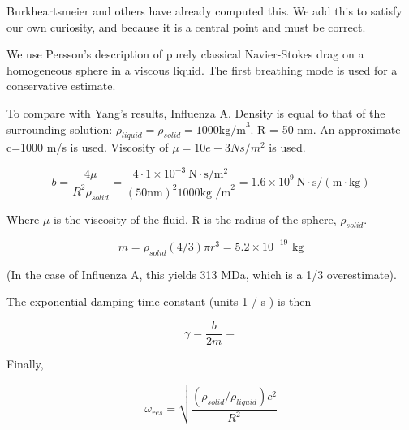 \documentclass[paper.tex]{subfiles}
\begin{document}
\begin{autem}
	Burkheartsmeier and others have already computed this. We add this to satisfy our own curiosity, and because it is a central point and must be correct.
\end{autem}


We use Persson's description of purely classical Navier-Stokes drag \cite{nature1986} on a homogeneous sphere in a viscous liquid. The first breathing mode is used for a conservative estimate.

To compare with Yang's results, Influenza A. Density is equal to that of the surrounding solution: $\rho_{liquid} = \rho_{solid} = 1000 \text{kg/m}^3$. R = 50 nm. An approximate c=1000 m/s is used. Viscosity of $\mu=10e-3 Ns/m^2$ is used.

$$ b = \frac{4\mu}{R^2 \rho_{solid}} = \frac{4 \cdot 1\times 10^{-3}\  \text{N}\cdot \text{s} / \text{m}^2 }{(50 \text{nm})^2 1000 \text{kg /m}^2} = 1.6 \times 10^9\ \text{N}\cdot \text{s} /( \text{m}\cdot\text{kg})$$

Where $\mu$ is the viscosity of the fluid, R is the radius of the sphere, $\rho_{solid}$. \footnotemark



$$m = \rho_{solid}  (4/3) \pi r^3 = 5.2 \times 10^{-19} \text{ kg} $$

(In the case of Influenza A, this yields 313 MDa, which is a 1/3 overestimate). 

The exponential damping time constant (units 1 / s ) is then

$$\gamma = \frac{b}{2m} = $$

Finally,

$$ \omega_{res} = \sqrt{\frac{(\rho_{solid} / \rho_{liquid})c^2}{R^2}} $$
\end{document}
